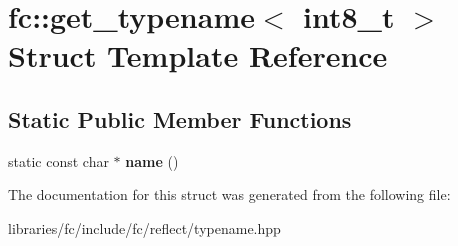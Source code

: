 \hypertarget{structfc_1_1get__typename_3_01int8__t_01_4}{}\section{fc\+:\+:get\+\_\+typename$<$ int8\+\_\+t $>$ Struct Template Reference}
\label{structfc_1_1get__typename_3_01int8__t_01_4}
\subsection*{Static Public Member Functions}
\begin{DoxyCompactItemize}
\item 
\mbox{\label{structfc_1_1get__typename_3_01int8__t_01_4_a64d811ddd230222a0c000540e9726492}} 
static const char $\ast$ {\bfseries name} ()
\end{DoxyCompactItemize}


The documentation for this struct was generated from the following file\+:\begin{DoxyCompactItemize}
\item 
libraries/fc/include/fc/reflect/typename.\+hpp\end{DoxyCompactItemize}
